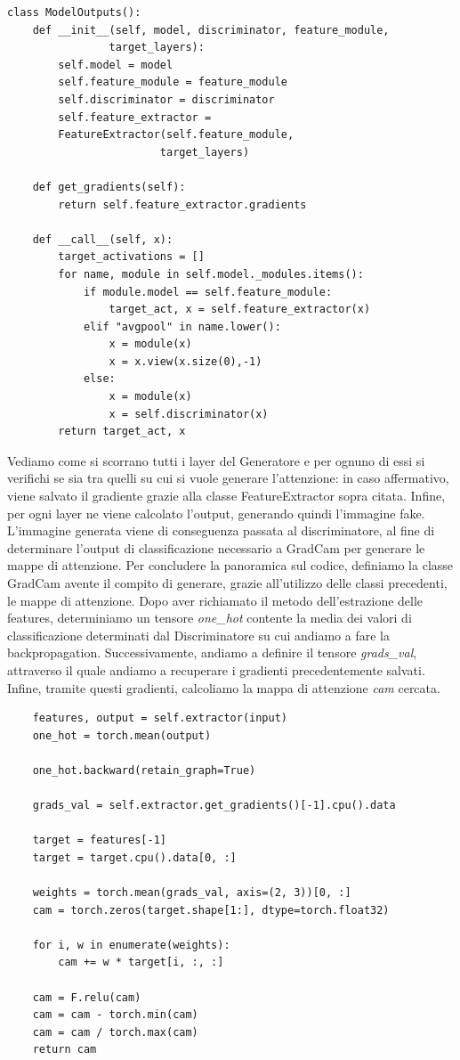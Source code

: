 \begin{verbatim}
class ModelOutputs():
    def __init__(self, model, discriminator, feature_module,
                target_layers):
        self.model = model
        self.feature_module = feature_module
        self.discriminator = discriminator
        self.feature_extractor =
        FeatureExtractor(self.feature_module,
                        target_layers)

    def get_gradients(self):
        return self.feature_extractor.gradients

    def __call__(self, x):
        target_activations = []
        for name, module in self.model._modules.items():
            if module.model == self.feature_module:
                target_act, x = self.feature_extractor(x)
            elif "avgpool" in name.lower():
                x = module(x)
                x = x.view(x.size(0),-1)
            else:
                x = module(x)
                x = self.discriminator(x)
        return target_act, x
\end{verbatim}

Vediamo come si scorrano tutti i layer del Generatore e per ognuno di essi si verifichi se sia tra quelli su cui si vuole generare l'attenzione: in caso affermativo, viene salvato il gradiente grazie alla classe FeatureExtractor sopra citata. Infine, per ogni layer ne viene calcolato l'output, generando quindi l'immagine fake. L'immagine generata viene di conseguenza passata al discriminatore, al fine di determinare l'output di classificazione necessario a GradCam per generare le mappe di attenzione.
Per concludere la panoramica sul codice, definiamo la classe GradCam avente il compito di generare, grazie all'utilizzo delle classi precedenti, le mappe di attenzione.
Dopo aver richiamato il metodo dell'estrazione delle features, determiniamo un tensore \emph{one\_hot} contente la media dei valori di classificazione determinati dal Discriminatore su cui andiamo a fare la backpropagation. Successivamente, andiamo a definire il tensore \emph{grads\_val}, attraverso il quale andiamo a recuperare i gradienti precedentemente salvati. Infine, tramite questi gradienti, calcoliamo la mappa di attenzione \emph{cam} cercata.
\begin{verbatim}
    features, output = self.extractor(input)
    one_hot = torch.mean(output)
    
    one_hot.backward(retain_graph=True)

    grads_val = self.extractor.get_gradients()[-1].cpu().data

    target = features[-1]
    target = target.cpu().data[0, :]

    weights = torch.mean(grads_val, axis=(2, 3))[0, :]
    cam = torch.zeros(target.shape[1:], dtype=torch.float32)

    for i, w in enumerate(weights):
        cam += w * target[i, :, :]

    cam = F.relu(cam)
    cam = cam - torch.min(cam)
    cam = cam / torch.max(cam)
    return cam
\end{verbatim}

